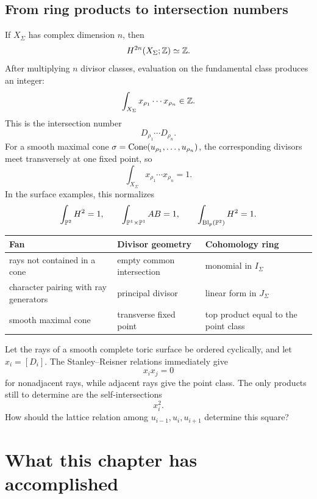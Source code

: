 \subsection{From ring products to intersection numbers}

If \(X_\Sigma\) has complex dimension \(n\), then
\[
H^{2n}(X_\Sigma;\mathbb{Z})\simeq\mathbb{Z}.
\]
After multiplying \(n\) divisor classes, evaluation on the fundamental
class produces an integer:
\[
\int_{X_\Sigma}
x_{\rho_1}\cdots x_{\rho_n}
\in\mathbb{Z}.
\]
This is the intersection number
\[
D_{\rho_1}\cdots D_{\rho_n}.
\]
For a smooth maximal cone
\(\sigma=\operatorname{Cone}(u_{\rho_1},\ldots,u_{\rho_n})\), the corresponding
divisors meet transversely at one fixed point, so
\[
\int_{X_\Sigma}x_{\rho_1}\cdots x_{\rho_n}=1.
\]
In the surface examples, this normalizes
\[
\int_{\mathbb{P}^2}H^2=1,
\qquad
\int_{\mathbb{P}^1\times\mathbb{P}^1}AB=1,
\qquad
\int_{\operatorname{Bl}_p(\mathbb{P}^2)}H^2=1.
\]

\begin{threedictionaries}
\begin{center}
\small
\begin{tabularx}{\linewidth}{@{}
  >{\raggedright\arraybackslash}X
  >{\raggedright\arraybackslash}X
  >{\raggedright\arraybackslash}X@{}}
\toprule
\textbf{Fan}
& \textbf{Divisor geometry}
& \textbf{Cohomology ring}
\\
\midrule
rays not contained in a cone
& empty common intersection
& monomial in \(I_\Sigma\)
\\
character pairing with ray generators
& principal divisor
& linear form in \(J_\Sigma\)
\\
smooth maximal cone
& transverse fixed point
& top product equal to the point class
\\
\bottomrule
\end{tabularx}
\end{center}
\end{threedictionaries}

\begin{prediction}
Let the rays of a smooth complete toric surface be ordered cyclically,
and let \(x_i=[D_i]\). The Stanley--Reisner relations immediately give
\[
x_ix_j=0
\]
for nonadjacent rays, while adjacent rays give the point class. The
only products still to determine are the self-intersections
\[
x_i^2.
\]
How should the lattice relation among
\(u_{i-1},u_i,u_{i+1}\) determine this square?
\end{prediction}

\clearpage
\section*{What this chapter has accomplished}

